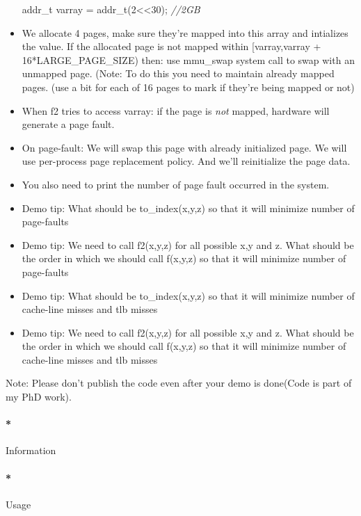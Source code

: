 \documentclass[]{article}
\newenvironment{Shaded}{}{}
\newcommand{\DecValTok}[1]{\textcolor[rgb]{0.00,0.00,1.00}{{#1}}}
\newcommand{\CommentTok}[1]{\textcolor[rgb]{0.50,0.50,0.50}{\textit{{#1}}}}
\newcommand{\NormalTok}[1]{{#1}}
\let\oldparagraph\paragraph
\renewcommand{\paragraph}[1]{\oldparagraph{#1}\mbox{}}
\begin{document}
\begin{itemize}
\begin{Shaded}
\begin{Highlighting}[]
\NormalTok{addr_t varray = addr_t(}\DecValTok{2}\NormalTok{<<}\DecValTok{30}\NormalTok{); }\CommentTok{//2GB}
\end{Highlighting}
\end{Shaded}
\item
  We allocate 4 pages, make sure they're mapped into this array and
  intializes the value. If the allocated page is not mapped within
  {[}varray,varray + 16*LARGE\_PAGE\_SIZE) then: use mmu\_swap system
  call to swap with an unmapped page. (Note: To do this you need to
  maintain already mapped pages. (use a bit for each of 16 pages to mark
  if they're being mapped or not)
\item
  When f2 tries to access varray: if the page is \emph{not} mapped,
  hardware will generate a page fault.
\item
  On page-fault: We will swap this page with already initialized page.
  We will use per-process page replacement policy. And we'll
  reinitialize the page data.
\item
  You also need to print the number of page fault occurred in the
  system.
\item
  Demo tip: What should be to\_index(x,y,z) so that it will minimize
  number of page-faults
\item
  Demo tip: We need to call f2(x,y,z) for all possible x,y and z. What
  should be the order in which we should call f(x,y,z) so that it will
  minimize number of page-faults
\item
  Demo tip: What should be to\_index(x,y,z) so that it will minimize
  number of cache-line misses and tlb misses
\item
  Demo tip: We need to call f2(x,y,z) for all possible x,y and z. What
  should be the order in which we should call f(x,y,z) so that it will
  minimize number of cache-line misses and tlb misses
\end{itemize}

Note: Please don't publish the code even after your demo is done(Code is
part of my PhD work).

\paragraph*{Information}\label{information-13}

\paragraph*{Usage}\label{usage-13}
\end{document}
